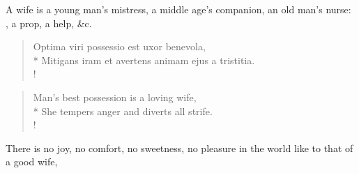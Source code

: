 
A wife is a young man's mistress, a middle age's companion, an
old man's nurse: , a prop, a help, \&c.

\begin{latin}%
\begin{verse}%
Optima viri possessio est uxor benevola,\\*
Mitigans iram et avertens animam ejus a tristitia.\\!
\end{verse}%
\end{latin}%
\translationrule%
\begin{verse}%
Man's best possession is a loving wife,\\*
She tempers anger and diverts all strife.\\!
\end{verse}%
%

There is no joy, no comfort, no sweetness, no pleasure in the world
like to that of a good wife,

